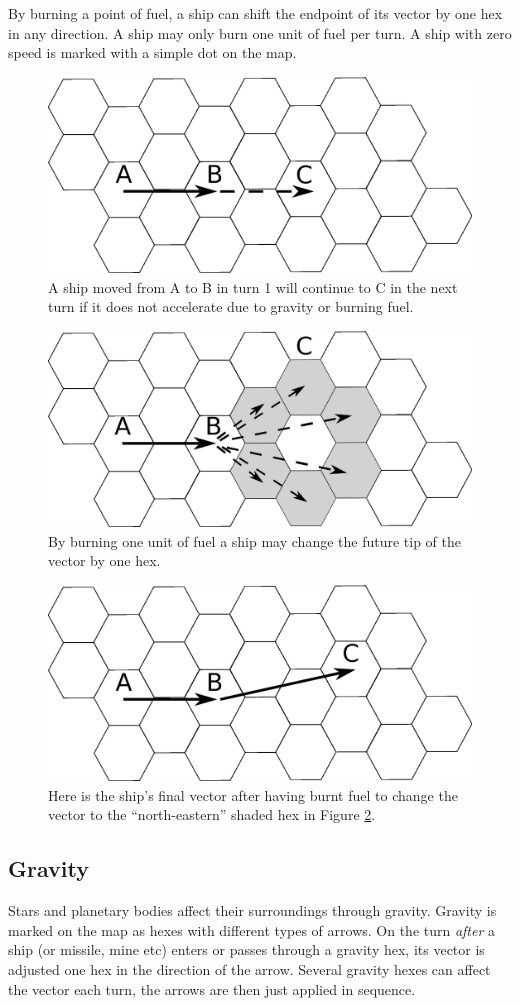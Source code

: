 \documentclass[a4paper,12pt,notitlepage,twocolumn]{article}
\begin{document}
By burning a point of fuel, a ship can shift the endpoint of its
vector by one hex in any direction. A ship may only burn one unit of
fuel per turn. A ship with zero speed is marked with a simple dot on the map.

\begin{figure}[h!]\centering  
  \includegraphics[width=0.5 \textwidth]{data/move_1.eps}  
  \caption{\footnotesize A ship moved from A to B in turn 1 will continue to C in
    the next turn if it does not accelerate due to gravity or burning
    fuel.}
\label{fig:1}
\end{figure}
\begin{figure}[h!]\centering  
  \includegraphics[width=0.5 \textwidth]{data/move_2.eps}  
  \caption{\footnotesize By burning one unit of fuel a ship may change
    the future tip of the vector by
    one hex.}
\label{fig:2}
\end{figure}
\begin{figure}[h!]\centering  
  \includegraphics[width=0.5 \textwidth]{data/move_3.eps}  
  \caption{\footnotesize Here is the ship's final vector after having burnt fuel to
    change the vector to the ``north-eastern'' shaded hex in Figure \ref{fig:2}.}
\label{fig:3}
\end{figure}

\subsection{Gravity}

Stars and planetary bodies affect their surroundings through
gravity. Gravity is marked on the map as hexes with different types of 
arrows. On the turn \emph{after} a ship (or missile, mine etc) enters or passes through a gravity
hex, its vector is adjusted one hex in the direction of the arrow.  Several gravity hexes
can affect the vector each turn, the arrows are then just applied in
sequence. 
\end{document}
